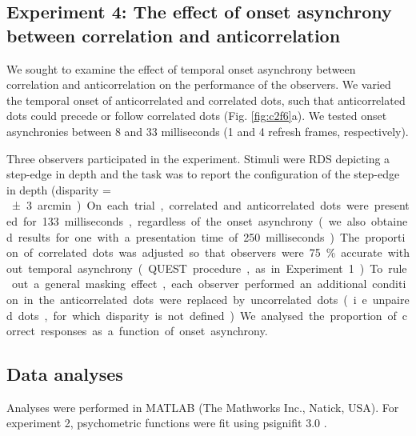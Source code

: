 \subsection{Experiment 4: The effect of onset asynchrony between correlation and anticorrelation}
We sought to examine the effect of temporal onset asynchrony between correlation and anticorrelation on the performance of the observers. We varied the temporal onset of anticorrelated and correlated dots, such that anticorrelated dots could precede or follow correlated dots (Fig. \ref{fig:c2f6}a). We tested onset asynchronies between 8 and 33 milliseconds (1 and 4 refresh frames, respectively). 

Three observers participated in the experiment. Stimuli were RDS depicting a step-edge in depth and the task was to report the configuration of the step-edge in depth (disparity =  \SI{\pm 3} arcmin). On each trial, correlated and anticorrelated dots were presented for 133 milliseconds, regardless of the onset asynchrony (we also obtained results for one with a presentation time of 250 milliseconds). The proportion of correlated dots was adjusted so that observers were 75\% accurate without temporal asynchrony (QUEST procedure, as in Experiment 1). To rule out a general masking effect, each observer performed an additional condition in the anticorrelated dots were replaced by uncorrelated dots (i.e. unpaired dots, for which disparity is not defined). We analysed the proportion of correct responses as a function of onset asynchrony.

\subsection{Data analyses}
Analyses were performed in MATLAB (The Mathworks Inc., Natick, USA). For experiment 2, psychometric functions were fit using psignifit 3.0 \cite{Frund:2011aa}. 

